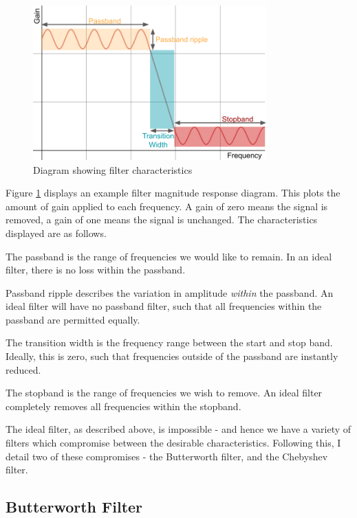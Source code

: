 \documentclass[12pt,a4paper,twoside,openright]{report}
\begin{document}
\begin{figure}[h!]
	\centerline{\includegraphics[width=0.8\textwidth]{figs/filter.png}}
\caption{Diagram showing filter characteristics}
\label{fig:filterdiag}
\end{figure}

Figure \ref{fig:filterdiag} displays an example filter magnitude response
diagram. This plots the amount of gain applied to each frequency. A gain of
zero means the signal is removed, a gain of one means the signal is unchanged.
The characteristics displayed are as follows.

The passband is the range of frequencies we would like to remain. In an ideal
filter, there is no loss within the passband.

Passband ripple describes the variation in amplitude \emph{within} the
passband. An ideal filter will have no passband filter, such that all
frequencies within the passband are permitted equally.

The transition width is the frequency range between the start and stop band.
Ideally, this is zero, such that frequencies outside of the passband are
instantly reduced.

The stopband is the range of frequencies we wish to remove. An ideal filter
completely removes all frequencies within the stopband.

The ideal filter, as described above, is impossible - and hence we have a
variety of filters which compromise between the desirable characteristics.
Following this, I detail two of these compromises - the Butterworth filter,
and the Chebyshev filter.


\subsection{Butterworth Filter}
\end{document}
